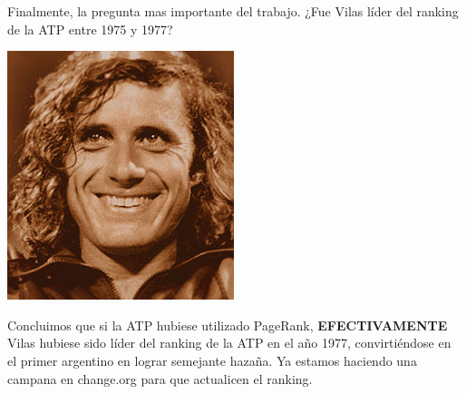 Finalmente, la pregunta mas importante del trabajo. ¿Fue Vilas líder del ranking de la ATP entre 1975 y 1977?

\begin{center}
\includegraphics[scale=1]{images/vilas2.jpg}
\end{center}

Concluimos que si la ATP hubiese utilizado PageRank, \textbf{EFECTIVAMENTE} Vilas hubiese sido líder del ranking de la ATP en el año 1977, convirtiéndose en el primer argentino en lograr semejante hazaña. Ya estamos haciendo una campana en change.org para que actualicen el ranking.